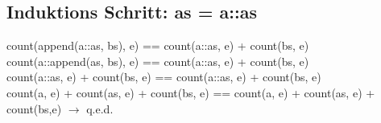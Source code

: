 \documentclass[12pt,runningheads,a4paper]{llncs}
\begin{document}
\subsection*{Induktions Schritt:   as = a::as}
count(append(a::as, bs), e) == count(a::as, e) + count(bs, e)\\
count(a::append(as, bs), e) == count(a::as, e) + count(bs, e)\\
count(a::as, e) + count(bs, e) == count(a::as, e) + count(bs, e)\\ 
count(a, e) + count(as, e) + count(bs, e) == count(a, e) + count(as, e) + count(bs,e) $\rightarrow$ q.e.d.
\end{document}
